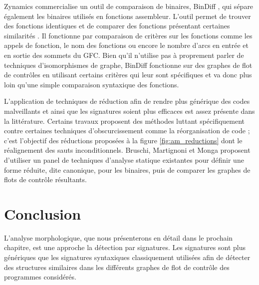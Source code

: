 Zynamics commercialise un outil de comparaison de binaires, BinDiff \cite{bindiff}, qui sépare également les binaires utilisés en fonctions assembleur.
L'outil permet de trouver des fonctions identiques et de comparer des fonctions présentant certaines similarités \cite{DR05}.
Il fonctionne par comparaison de critères sur les fonctions comme les appels de fonction, le nom des fonctions ou encore le nombre d'arcs en entrée et en sortie des sommets du GFC. Bien qu'il n'utilise pas à proprement parler de techniques d'isomorphismes de graphe, BinDiff fonctionne sur des graphes de flot de contrôles en utilisant certains critères qui leur sont spécifiques et va donc plus loin qu'une simple comparaison syntaxique des fonctions.

L'application de techniques de réduction afin de rendre plus générique des codes malveillants et ainsi que les signatures soient plus efficaces est assez présente dans la littérature. 
Certains travaux \cite{CKJKVM05} proposent des méthodes luttant spécifiquement contre certaines techniques d'obscurcissement comme la réorganisation de code ; c'est l'objectif des réductions proposées à la figure \ref{fig:am_reductions} dont le réalignement des sauts inconditionnels.
Bruschi, Martignoni et Monga \cite{BMM06} proposent d'utiliser un panel de techniques d'analyse statique existantes pour définir une forme réduite, dite canonique, pour les binaires, puis de comparer les graphes de flots de contrôle résultants.

\section{Conclusion}
L'analyse morphologique, que nous présenterons en détail dans le prochain chapitre, est une approche la détection par signatures.
Les signatures sont plus génériques que les signatures syntaxiques classiquement utilisées afin de détecter des structures similaires dans les différents graphes de flot de contrôle des programmes considérés.